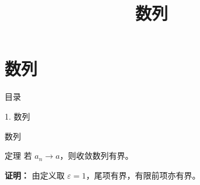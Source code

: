 \documentclass[aspectratio=169,10pt,fontset=fandol]{ctexbeamer}
\title{数列}
\begin{document}
\section{数列}
\begin{frame}[t,fragile]{目录}
\normalsize
{\color{blue}\normalsize 1. 数列\par}\vspace{0.3em}
\end{frame}
\begin{frame}[t,fragile]{数列}
\normalsize
\begin{block}{定理}
{\normalsize
若 $a_n\to a$，则收敛数列有界。
}
\end{block}
\pause
{\normalsize
\textbf{证明：}
由定义取 $\varepsilon=1$，尾项有界，有限前项亦有界。
}
\end{frame}
\end{document}
